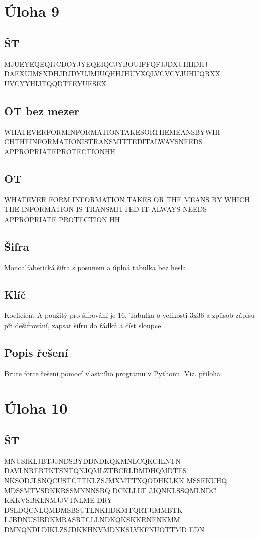 \documentclass[12pt]{article} %
\begin{document}
\section{Úloha 9}
\subsection{ŠT}
MJUEYEQEQIJCDOYJYEQEIQCJYBOUIFFQFJJDXUHHDHJ
DAEXUIMSXDHJDJDYUJMIUQHHJHUYXQLVCVCYJUHUQRXX
UVCYYHIJTQQDTFEYUESEX


\subsection{OT bez mezer}
WHATEVERFORMINFORMATIONTAKESORTHEMEANSBYWHI
CHTHEINFORMATIONISTRANSMITTEDITALWAYSNEEDS
APPROPRIATEPROTECTIONHH
\subsection{OT}
WHATEVER FORM INFORMATION TAKES OR THE
MEANS BY WHICH THE INFORMATION IS TRANSMITTED 
IT ALWAYS NEEDS APPROPRIATE PROTECTION HH
\subsection{Šifra}
Monoalfabetická šifra s posunem a úplná tabulka bez hesla.
\subsection{Klíč}
Koeficient A použitý pro šifrování je 16. Tabulka o velikosti 3x36 a způsob zápisu při dešifrování, zapsat šifru do řádků a číst sloupce.
\subsection{Popis řešení}
Brute force řešení pomocí vlastního programu v Pythonu. Viz. přiloha.


\section{Úloha 10}
\subsection{ŠT}
MNUSIKLJBTJJNDSBYDDNDKQKMNLCQKGILNTN
DAVLNREBTKTSNTQNJQMLZTBCRLDMDHQMDTES
NKSODJLSNQCUSTCTTKLZSJMXMTTXQODHKLKK
MSSEKUHQ MDSSMTVSDKKRSSMNNNSBQ
DCKLLLT
JJQNKLSSQMLNDC     KKKVSBKLNMJJVTNLME
DRY
DSLDQCNLQMDMSBSUTLNKHDKMTQRTJIMMBTK
LJBDNUSIBDKMRASRTCLLNDKQKSKKRNENKMM
DMNQNDLDIKLZSJDKKHNVMDNKSLVKFNUOTTMD
EDN
\end{document}
